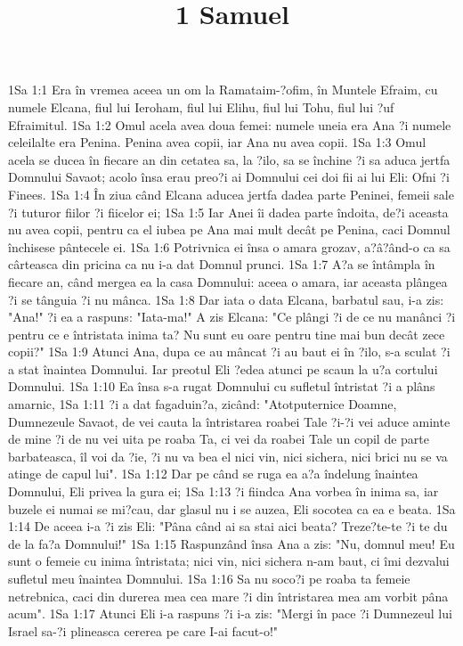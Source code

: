 

\title{1 Samuel}

1Sa 1:1  Era în vremea aceea un om la Ramataim-?ofim, în Muntele Efraim, cu numele Elcana, fiul lui Ieroham, fiul lui Elihu, fiul lui Tohu, fiul lui ?uf Efraimitul.
1Sa 1:2  Omul acela avea doua femei: numele uneia era Ana ?i numele celeilalte era Penina. Penina avea copii, iar Ana nu avea copii.
1Sa 1:3  Omul acela se ducea în fiecare an din cetatea sa, la ?ilo, sa se închine ?i sa aduca jertfa Domnului Savaot; acolo însa erau preo?i ai Domnului cei doi fii ai lui Eli: Ofni ?i Finees.
1Sa 1:4  În ziua când Elcana aducea jertfa dadea parte Peninei, femeii sale ?i tuturor fiilor ?i fiicelor ei;
1Sa 1:5  Iar Anei îi dadea parte îndoita, de?i aceasta nu avea copii, pentru ca el iubea pe Ana mai mult decât pe Penina, caci Domnul închisese pântecele ei.
1Sa 1:6  Potrivnica ei însa o amara grozav, a?â?ând-o ca sa cârteasca din pricina ca nu i-a dat Domnul prunci.
1Sa 1:7  A?a se întâmpla în fiecare an, când mergea ea la casa Domnului: aceea o amara, iar aceasta plângea ?i se tânguia ?i nu mânca.
1Sa 1:8  Dar iata o data Elcana, barbatul sau, i-a zis: "Ana!" ?i ea a raspuns: "Iata-ma!" A zis Elcana: "Ce plângi ?i de ce nu manânci ?i pentru ce e întristata inima ta? Nu sunt eu oare pentru tine mai bun decât zece copii?"
1Sa 1:9  Atunci Ana, dupa ce au mâncat ?i au baut ei în ?ilo, s-a sculat ?i a stat înaintea Domnului. Iar preotul Eli ?edea atunci pe scaun la u?a cortului Domnului.
1Sa 1:10  Ea însa s-a rugat Domnului cu sufletul întristat ?i a plâns amarnic,
1Sa 1:11  ?i a dat fagaduin?a, zicând: "Atotputernice Doamne, Dumnezeule Savaot, de vei cauta la întristarea roabei Tale ?i-?i vei aduce aminte de mine ?i de nu vei uita pe roaba Ta, ci vei da roabei Tale un copil de parte barbateasca, îl voi da ?ie, ?i nu va bea el nici vin, nici sichera, nici brici nu se va atinge de capul lui".
1Sa 1:12  Dar pe când se ruga ea a?a îndelung înaintea Domnului, Eli privea la gura ei;
1Sa 1:13  ?i fiindca Ana vorbea în inima sa, iar buzele ei numai se mi?cau, dar glasul nu i se auzea, Eli socotea ca ea e beata.
1Sa 1:14  De aceea i-a ?i zis Eli: "Pâna când ai sa stai aici beata? Treze?te-te ?i te du de la fa?a Domnului!"
1Sa 1:15  Raspunzând însa Ana a zis: "Nu, domnul meu! Eu sunt o femeie cu inima întristata; nici vin, nici sichera n-am baut, ci îmi dezvalui sufletul meu înaintea Domnului.
1Sa 1:16  Sa nu soco?i pe roaba ta femeie netrebnica, caci din durerea mea cea mare ?i din întristarea mea am vorbit pâna acum".
1Sa 1:17  Atunci Eli i-a raspuns ?i i-a zis: "Mergi în pace ?i Dumnezeul lui Israel sa-?i plineasca cererea pe care I-ai facut-o!"
